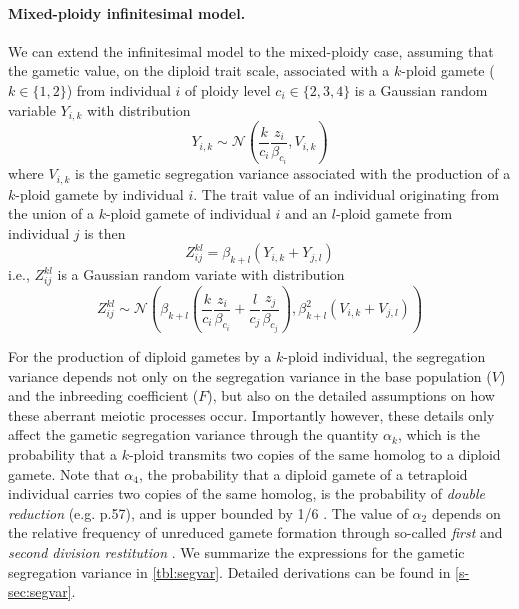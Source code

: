 \documentclass[unnumsec,webpdf,modern,large]{_oup-authoring-template}
\theoremstyle{thmstyleone}%
\theoremstyle{thmstyletwo}%
\theoremstyle{thmstylethree}%
\newcommand{\Normal}{\mathcal{N}}
\begin{document}
\paragraph{Mixed-ploidy infinitesimal model.}

We can extend the infinitesimal model to the mixed-ploidy case, assuming that the
gametic value, on the diploid trait scale, associated with a $k$-ploid gamete ($k
\in \{1,2\}$) from individual $i$ of ploidy level $c_i \in \{2,3,4\}$ is a
Gaussian random variable $Y_{i,k}$ with distribution
  $$Y_{i,k} \sim \Normal\left(\frac{k}{c_i}\frac{z_i}{\beta_{c_i}}, V_{i,k}\right)$$
where $V_{i,k}$ is the gametic segregation variance associated with the
production of a $k$-ploid gamete by individual $i$.
The trait value of an individual originating from the union of a $k$-ploid
gamete of individual $i$ and an $l$-ploid gamete from individual $j$ is then
  $$Z_{ij}^{kl} = \beta_{k+l}\left(Y_{i,k} + Y_{j,l}\right)$$
i.e., $Z_{ij}^{kl}$ is a Gaussian random variate with distribution
\begin{equation}
  Z_{ij}^{kl} \sim \Normal\left(
    \beta_{k+l} \left(
          \frac{k}{c_i}\frac{z_i}{\beta_{c_i}} 
        + \frac{l}{c_j}\frac{z_j}{\beta_{c_j}}\right), 
    \beta_{k+l}^2 (V_{i,k} + V_{j,l})\right)
   \label{eq:oneline}
\end{equation}

For the production of diploid gametes by a $k$-ploid individual, the
segregation variance depends not only on the segregation variance in the base
population ($V$) and the inbreeding coefficient ($F$), but also on the detailed
assumptions on how these aberrant meiotic processes occur.
Importantly however, these details only affect the gametic segregation variance
through the quantity $\alpha_k$, which is the probability that a $k$-ploid
transmits two copies of the same homolog to a diploid gamete.
Note that $\alpha_4$, the probability that a diploid gamete of a tetraploid
individual carries two copies of the same homolog, is the probability of
\textit{double reduction} (e.g. \cite{lynch1998} p.57), and is upper bounded by
1/6 \citep{stift2008}.
The value of $\alpha_2$ depends on the relative frequency of unreduced gamete
formation through so-called \textit{first} and \textit{second division
restitution} \citep{bretagnolle1995,storme2013}.
We summarize the expressions for the gametic segregation variance in
\cref{tbl:segvar}.
Detailed derivations can be found in \cref{s-sec:segvar}.
\end{document}
